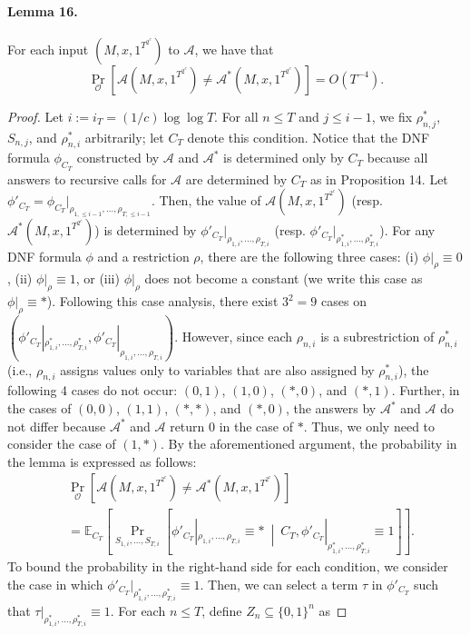 \paragraph{Lemma 16.}
For each input $(M,x,1^{T^{2^c}})$ to $\mathcal A$, we have that
\[\Pr_{\mathcal O}[\mathcal A(M,x,1^{T^{2^c}})\neq\mathcal A^*(M,x,1^{T^{2^c}})]=O(T^{-4}).\]
\begin{proof}
Let $i:=i_T=(1/c)\log\log T$. For all $n\leq T$ and $j\leq i-1$, we fix $\rho^*_{n,j}$, $S_{n,j}$, and $\rho^*_{n,i}$ arbitrarily; let $C_T$ denote this condition. Notice that the DNF formula $\phi_{C_T}$ constructed by $\mathcal A$ and $\mathcal A^*$ is determined only by $C_T$ because all answers to recursive calls for $\mathcal A$ are determined by $C_T$ as in Proposition 14. Let $\phi'_{C_T}=\phi_{C_T}|_{\rho_{1,\leq i-1},\ldots,\rho_{T,\leq i-1}}$. Then, the value of $\mathcal A(M,x,1^{T^{2^c}})$ (resp. $\mathcal A^*(M,x,1^{T^{2^c}})$) is determined by $\phi'_{C_T}|_{\rho_{1,i},\ldots,\rho_{T,i}}$ (resp. $\phi'_{C_T}|_{\rho^*_{1,i},\ldots,\rho^*_{T,i}}$).
For any DNF formula $\phi$ and a restriction $\rho$, there are the following three cases: (i) $\phi|_\rho\equiv0$, (ii) $\phi|_\rho\equiv1$, or (iii) $\phi|_\rho$ does not become a constant (we write this case as $\phi|_\rho\equiv*$). Following this case analysis, there exist $3^2=9$ cases on $(\phi'_{C_T}|_{\rho^*_{1,i},\ldots,\rho^*_{T,i}},\phi'_{C_T}|_{\rho_{1,i},\ldots,\rho_{T,i}})$. However, since each $\rho_{n,i}$ is a subrestriction of $\rho^*_{n,i}$ (i.e., $\rho_{n,i}$ assigns values only to variables that are also assigned by $\rho^*_{n,i}$), the following 4 cases do not occur: $(0,1)$, $(1,0)$, $(*,0)$, and $(*,1)$. Further, in the cases of $(0,0)$, $(1,1)$, $(*,*)$, and $(*,0)$, the answers by $\mathcal A^*$ and $\mathcal A$ do not differ because $\mathcal A^*$ and $\mathcal A$ return 0 in the case of $*$. Thus, we only need to consider the case of $(1,*)$.
By the aforementioned argument, the probability in the lemma is expressed as follows:
\begin{align*}
&\Pr_{\mathcal O}[\mathcal A(M,x,1^{T^{2^c}})\neq\mathcal A^*(M,x,1^{T^{2^c}})]\\
&=\mathbb E_{C_T}\!\left[\Pr_{S_{1,i},\ldots,S_{T,i}}\!\left[\phi'_{C_T}|_{\rho_{1,i},\ldots,\rho_{T,i}}\equiv*\ \middle|\ C_T,\phi'_{C_T}|_{\rho^*_{1,i},\ldots,\rho^*_{T,i}}\equiv1\right]\right].
\end{align*}
To bound the probability in the right-hand side for each condition, we consider the case in which $\phi'_{C_T}|_{\rho^*_{1,i},\ldots,\rho^*_{T,i}}\equiv1$. Then, we can select a term $\tau$ in $\phi'_{C_T}$ such that $\tau|_{\rho^*_{1,i},\ldots,\rho^*_{T,i}}\equiv1$. For each $n\leq T$, define $Z_n\subseteq\{0,1\}^n$ as

\end{proof}
